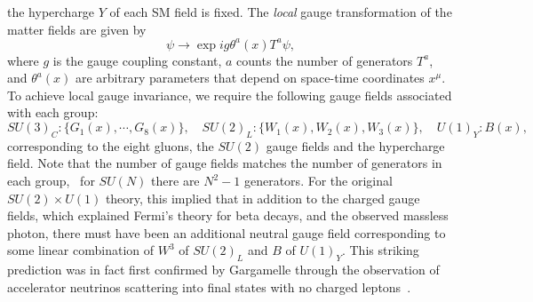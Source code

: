 %
the hypercharge $Y$ of each SM field is fixed. The \emph{local} gauge transformation of the matter fields are given by
\begin{equation}
\psi  \to \exp{i g \theta^a(x) T^a } \psi,
\end{equation}
where $g$ is the gauge coupling constant, $a$ counts the number of generators $T^a$, and $\theta^a(x)$ are arbitrary parameters that depend on space-time coordinates $x^\mu$. To achieve local gauge invariance, we require the following gauge fields associated with each group:
%
\begin{equation}
 SU(3)_C: \{G_1 (x), \cdots, G_8 (x)\}, \quad SU(2)_L:  \{W_1(x), W_2(x), W_3(x)\}, \quad U(1)_Y: B(x),
\end{equation}
%
corresponding to the eight gluons, the $SU(2)$ gauge fields and the hypercharge field. Note that the number of gauge fields matches the number of generators in each group, \eg\ for $SU(N)$ there are $N^2 -1$ generators. For the original $SU(2)\times U(1)$ theory, this implied that in addition to the charged gauge fields, which explained Fermi's theory for beta decays, and the observed massless photon, there must have been an additional neutral gauge field corresponding to some linear combination of $W^3$ of $SU(2)_L$ and $B$ of $U(1)_Y$. This striking prediction was in fact first confirmed by Gargamelle through the observation of accelerator neutrinos scattering into final states with no charged leptons~\cite{Hasert:1973ff}. 

